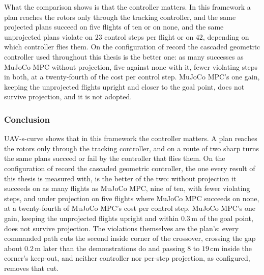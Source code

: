 What the comparison shows is that the controller matters. In this framework a plan reaches the rotors only
through the tracking controller, and the same projected plans succeed on five flights of ten or on none, and
the same unprojected plans violate on $23$ control steps per flight or on $42$, depending on which controller
flies them. On the configuration of record the cascaded geometric controller used throughout this thesis is
the better one: as many successes as MuJoCo MPC without projection, five against none with it, fewer violating
steps in both, at a twenty-fourth of the cost per control step. MuJoCo MPC's one gain, keeping the unprojected
flights upright and closer to the goal point, does not survive projection, and it is not adopted.

\FloatBarrier
\subsubsection{Conclusion}\label{sec:res:uav:scurve:conclusion}

UAV-s-curve shows that in this framework the controller matters. A plan reaches the rotors only through the
tracking controller, and on a route of two sharp turns the same plans succeed or fail by the controller that
flies them. On the configuration of record the cascaded geometric controller, the one every result of this
thesis is measured with, is the better of the two: without projection it succeeds on as many flights as
MuJoCo MPC, nine of ten, with fewer violating steps, and under projection on five flights where MuJoCo MPC
succeeds on none, at a twenty-fourth of MuJoCo MPC's cost per control step. MuJoCo MPC's one gain, keeping
the unprojected flights upright and within $0.3$\,m of the goal point, does not survive projection. The
violations themselves are the plan's: every commanded path cuts the second inside corner of the crossover,
crossing the gap about $0.2$\,m later than the demonstrations do and passing $8$ to $19$\,cm inside the
corner's keep-out, and neither controller nor per-step projection, as configured, removes that cut.

